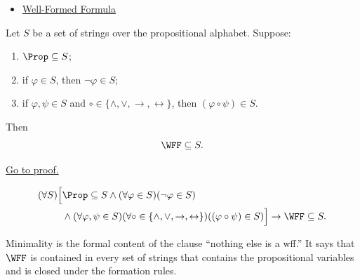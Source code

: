 \begin{dependencies}
\begin{itemize}
  \item \hyperref[def:well-formed-formula]{Well-Formed Formula}
\end{itemize}
\end{dependencies}
\begin{tcolorbox}[colback=thmbox, colframe=thmborder, arc=2pt,
  left=6pt, right=6pt, top=4pt, bottom=4pt,
  title={\small\textbf{Theorem (Minimality of Well-Formed Formulas)}},
  fonttitle=\small\bfseries]
\begin{theorem}
\label{thm:minimality-of-well-formed-formulas}
Let \(S\) be a set of strings over the propositional alphabet. Suppose:
\begin{enumerate}
  \item \(\Prop\subseteq S\);
  \item if \(\varphi\in S\), then \(\neg\varphi\in S\);
  \item if \(\varphi,\psi\in S\) and
        \(\circ\in\{\land,\lor,\to,\leftrightarrow\}\), then
        \((\varphi\circ\psi)\in S\).
\end{enumerate}
Then
\[
\WFF\subseteq S.
\]

\noindent\hyperref[prf:minimality-of-well-formed-formulas]{Go to proof.}
\end{theorem}
\end{tcolorbox}

\begin{remark*}
\[
\begin{aligned}
(\forall S)\Big[
&\Prop\subseteq S
\land
(\forall\varphi\in S)(\neg\varphi\in S)\\
&\land
(\forall\varphi,\psi\in S)
(\forall\circ\in\{\land,\lor,\to,\leftrightarrow\})
((\varphi\circ\psi)\in S)
\Big]
\to
\WFF\subseteq S.
\end{aligned}
\]
\end{remark*}

\begin{remark*}[Interpretation]
Minimality is the formal content of the clause ``nothing else is a wff.'' It says
that \(\WFF\) is contained in every set of strings that contains the
propositional variables and is closed under the formation rules.
\end{remark*}

